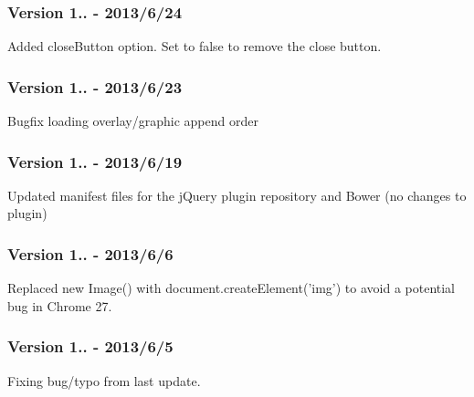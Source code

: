 \subsubsection*{Version 1.. -\/ 2013/6/24}


\begin{DoxyItemize}
\item Added close\-Button option. Set to false to remove the close button.
\end{DoxyItemize}

\subsubsection*{Version 1.. -\/ 2013/6/23}


\begin{DoxyItemize}
\item Bugfix loading overlay/graphic append order
\end{DoxyItemize}

\subsubsection*{Version 1.. -\/ 2013/6/19}


\begin{DoxyItemize}
\item Updated manifest files for the j\-Query plugin repository and Bower (no changes to plugin)
\end{DoxyItemize}

\subsubsection*{Version 1.. -\/ 2013/6/6}


\begin{DoxyItemize}
\item Replaced new Image() with document.\-create\-Element('img') to avoid a potential bug in Chrome 27.
\end{DoxyItemize}

\subsubsection*{Version 1.. -\/ 2013/6/5}


\begin{DoxyItemize}
\item Fixing bug/typo from last update.
\end{DoxyItemize}

